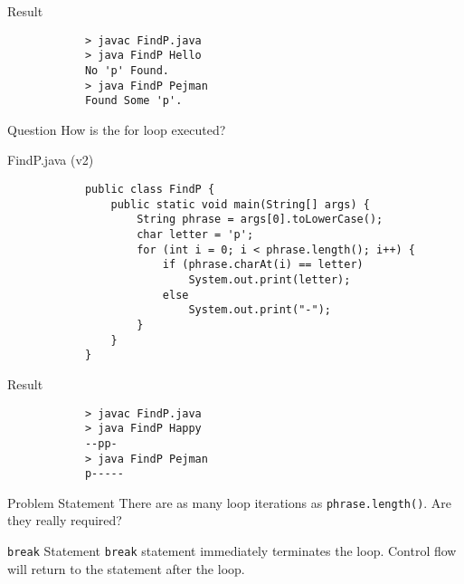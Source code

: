 \documentclass[10pt, compress]{beamer}
\begin{document}
\begin{slide}
	\begin{block}{Result}
		\begin{verbatim}
			> javac FindP.java
			> java FindP Hello
			No 'p' Found.
			> java FindP Pejman
			Found Some 'p'.
		\end{verbatim}
	\end{block}
	\begin{block}{Question}
		How is the for loop executed?
	\end{block}
\end{slide}

\begin{slide}
	\begin{block}{FindP.java (v2)}
		\begin{verbatim}
			public class FindP {
			    public static void main(String[] args) {
			        String phrase = args[0].toLowerCase();
			        char letter = 'p';
			        for (int i = 0; i < phrase.length(); i++) {
			            if (phrase.charAt(i) == letter)
			                System.out.print(letter);
			            else
			                System.out.print("-");
			        }
			    }
			}
		\end{verbatim}
	\end{block}
\end{slide}

\begin{slide}
	\begin{block}{Result}
		\begin{verbatim}
			> javac FindP.java
			> java FindP Happy
			--pp-
			> java FindP Pejman
			p-----
		\end{verbatim}
	\end{block}
	\begin{block}{Problem Statement}
		There are as many loop iterations as \texttt{phrase.length()}. Are they really required?
	\end{block}
\end{slide}

\begin{slide}
	\begin{block}{\texttt{break} Statement}
		\texttt{break} statement immediately terminates the loop.
		Control flow will return to the statement after the loop.
	\end{block}
\end{slide}
\end{document}
